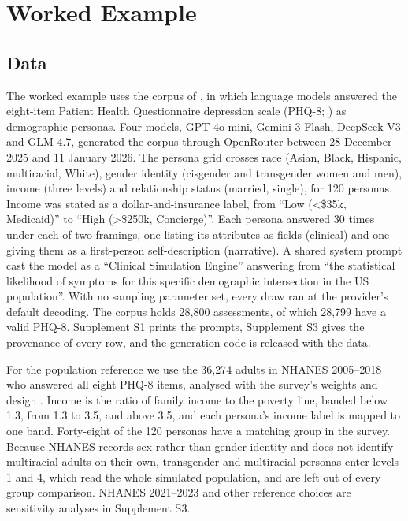 
\section{Worked Example}
\label{sec:data}

\subsection{Data}

The worked example uses the corpus of \citet{keough2026plausible}, in which language models answered the eight-item Patient Health Questionnaire depression scale (PHQ-8; \citealp{kroenke2009phq8}) as demographic personas.
Four models, GPT-4o-mini, Gemini-3-Flash, DeepSeek-V3 and GLM-4.7, generated the corpus through OpenRouter between 28 December 2025 and 11 January 2026. %
The persona grid crosses race (Asian, Black, Hispanic, multiracial, White), gender identity (cisgender and transgender women and men), income (three levels) and relationship status (married, single), for 120 personas.
Income was stated as a dollar-and-insurance label, from ``Low (<\$35k, Medicaid)'' to ``High (>\$250k, Concierge)''.
Each persona answered 30 times under each of two framings, one listing its attributes as fields (clinical) and one giving them as a first-person self-description (narrative).
A shared system prompt cast the model as a ``Clinical Simulation Engine'' answering from ``the statistical likelihood of symptoms for this specific demographic intersection in the US population''.
With no sampling parameter set, every draw ran at the provider's default decoding.
The corpus holds 28,800 assessments, of which 28,799 have a valid PHQ-8. %
Supplement S1 prints the prompts, Supplement S3 gives the provenance of every row, and the generation code is released with the data.

For the population reference we use the 36,274 adults in NHANES 2005--2018 who answered all eight PHQ-8 items, analysed with the survey's weights and design \citep{johnson2013nhanes,chen2018nhanes,nchs2018analytic}. %
Income is the ratio of family income to the poverty line, banded below 1.3, from 1.3 to 3.5, and above 3.5, and each persona's income label is mapped to one band.
Forty-eight of the 120 personas have a matching group in the survey.
Because NHANES records sex rather than gender identity and does not identify multiracial adults on their own, transgender and multiracial personas enter levels 1 and 4, which read the whole simulated population, and are left out of every group comparison.
NHANES 2021--2023 and other reference choices are sensitivity analyses in Supplement S3.

